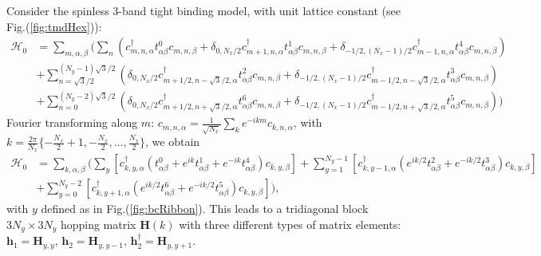 Consider the spinless 3-band tight binding model, with unit lattice constant (see Fig.(\ref{fig:tmdHex})):
\begin{equation}
\begin{split}
\mathcal{H}_0 &= \sum_{m, \alpha, \beta} \bigg( \sum_n ( c_{m,n, \alpha}^\dagger t_{\alpha\beta}^0 c_{m, n, \beta} + \delta_{0, N_x / 2}  c_{m+1, n, \alpha}^\dagger t_{\alpha\beta}^1 c_{m,n, \beta} + \delta_{-1/2, (N_x -1)/2}  c_{m-1, n, \alpha}^\dagger t_{\alpha\beta}^4 c_{m,n, \beta} )\\
& +\sum_{n = \sqrt{3}/2}^{(N_y - 1) \sqrt{3} / 2} ( \delta_{0, N_x / 2}  c_{m+1/2,n-\sqrt{3}/2, \alpha}^\dagger t_{\alpha\beta}^2 c_{m, n, \beta} + \delta_{-1/2, (N_x -1)/2} c_{m-1/2,n-\sqrt{3}/2, \alpha}^\dagger t_{\alpha\beta}^3 c_{m, n, \beta} ) \\
&+\sum_{n = 0}^{(N_y - 2) \sqrt{3} / 2} (  \delta_{0, N_x / 2} c_{m+1/2,n+\sqrt{3}/2, \alpha}^\dagger t_{\alpha\beta}^6 c_{m, n, \beta} + \delta_{-1/2, (N_x -1)/2} c_{m-1/2,n+\sqrt{3}/2, \alpha}^\dagger t_{\alpha\beta}^5 c_{m, n, \beta} ) \bigg)
\end{split}
\end{equation}
Fourier transforming along $m$: $c_{m, n, \alpha} = \frac{1}{\sqrt{N_x}}\sum_{k} e^{-i k m } c_{k, n, \alpha} $, with $k = \frac{2\pi}{N_x} \{ -\frac{N_x}{2} + 1, -\frac{N_x}{2}, ..., \frac{N_x}{2} \}$, we obtain
\begin{equation}
\begin{split}
\mathcal{H}_0 &= \sum_{k, \alpha, \beta} \bigg( \sum_y [ c_{k, y, \alpha}^\dagger (t_{\alpha \beta}^0  + e^{ik} t_{\alpha \beta}^1 + e^{-ik} t_{\alpha \beta}^4 )  c_{k, y, \beta} ] + \sum_{y = 1}^{N_y -1} [ c_{k, y - 1, \alpha}^\dagger ( e^{ik/2} t_{\alpha \beta}^2 + e^{-ik/2} t_{\alpha \beta}^3 ) c_{k, y, \beta} ] \\
& + \sum_{y = 0}^{N_y -2} [ c_{k, y + 1, \alpha}^\dagger ( e^{ik/2} t_{\alpha \beta}^6 + e^{-ik/2} t_{\alpha \beta}^5 ) c_{k, y, \beta} ] \bigg),
\end{split}
\end{equation}
with $y$ defined as in Fig.(\ref{fig:bcRibbon}).
This leads to a tridiagonal block $3 N_y \times 3 N_y$ hopping matrix $\bm H (k)$ with three different types of matrix elements: $\bm h_1 = \bm H_{y,y}$, $\bm h_2 = \bm H_{y,y-1}$, $\bm h_2^\dagger = \bm H_{y, y+1}$.
